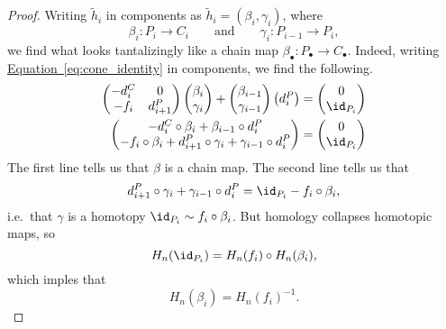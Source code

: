 \documentclass[main.tex]{subfiles}
\begin{document}
\begin{proof}
  Writing $\tilde{h}_{i}$ in components as $\tilde{h}_{i} = (\beta_{i}, \gamma_{i})$, where
  \begin{equation*}
    \beta_{i}\colon P_{i} \to C_{i}\qquad\text{and}\qquad \gamma_{i}\colon P_{i-1} \to P_{i},
  \end{equation*}
  we find what looks tantalizingly like a chain map $\beta_{\bullet}\colon P_{\bullet} \to C_{\bullet}$. Indeed, writing \hyperref[eq:cone_identity]{Equation~\ref*{eq:cone_identity}} in components, we find the following.
  \begin{align*}
    \begin{pmatrix}
      -d^{C}_{i} & 0 \\
      -f_{i} & d^{P}_{i+1}
    \end{pmatrix}
    \begin{pmatrix}
      \beta_{i} \\
      \gamma_{i}
    \end{pmatrix}
    +
    \begin{pmatrix}
      \beta_{i-1} \\
      \gamma_{i-1}
    \end{pmatrix}
    \begin{pmatrix}
      d^{P}_{i}
    \end{pmatrix}
    &=
    \begin{pmatrix}
      0 \\
      \id_{P_{i}}
    \end{pmatrix}
    \\
    \begin{pmatrix}
      -d^{C}_{i} \circ \beta_{i} + \beta_{i-1} \circ d^{P}_{i} \\
      -f_{i} \circ \beta_{i} + d^{P}_{i+1} \circ \gamma_{i} + \gamma_{i-1} \circ d^{P}_{i}
    \end{pmatrix}
    &=
    \begin{pmatrix}
      0 \\
      \id_{P_{i}}
    \end{pmatrix}
  \end{align*}
  The first line tells us that $\beta$ is a chain map. The second line tells us that
  \begin{equation*}
    d^{P}_{i+1} \circ \gamma_{i} + \gamma_{i-1} \circ d^{P}_{i} = \id_{P_{i}} - f_{i} \circ \beta_{i},
  \end{equation*}
  i.e.\ that $\gamma$ is a homotopy $\id_{P_{i}} \sim f_{i} \circ \beta_{i}$. But homology collapses homotopic maps, so
  \begin{equation*}
    H_{n}(\id_{P_{i}}) = H_{n}(f_{i}) \circ H_{n}(\beta_{i}),
  \end{equation*}
  which imples that
  \begin{equation*}
    H_{n}(\beta_{i}) = H_{n}(f_{i})^{-1}.
  \end{equation*}
\end{proof}
\end{document}
